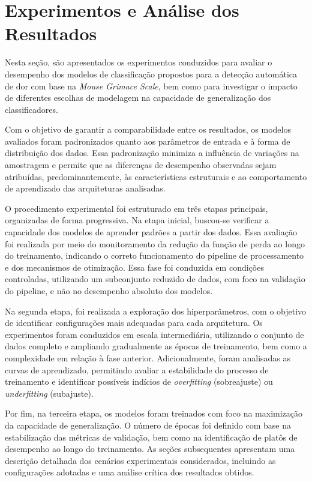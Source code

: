 \chapter[Experimentos e Análise dos Resultados]{Experimentos e Análise dos Resultados}

Nesta seção, são apresentados os experimentos conduzidos para avaliar o desempenho dos modelos de classificação propostos para a detecção automática de dor com base na \textit{Mouse Grimace Scale}, bem como para investigar o impacto de diferentes escolhas de modelagem na capacidade de generalização dos classificadores.

Com o objetivo de garantir a comparabilidade entre os resultados, os modelos avaliados foram padronizados quanto aos parâmetros de entrada e à forma de distribuição dos dados. Essa padronização minimiza a influência de variações na amostragem e permite que as diferenças de desempenho observadas sejam atribuídas, predominantemente, às características estruturais e ao comportamento de aprendizado das arquiteturas analisadas.

O procedimento experimental foi estruturado em três etapas principais, organizadas de forma progressiva. Na etapa inicial, buscou-se verificar a capacidade dos modelos de aprender padrões a partir dos dados. Essa avaliação foi realizada por meio do monitoramento da redução da função de perda ao longo do treinamento, indicando o correto funcionamento do pipeline de processamento e dos mecanismos de otimização. Essa fase foi conduzida em condições controladas, utilizando um subconjunto reduzido de dados, com foco na validação do pipeline, e não no desempenho absoluto dos modelos.

Na segunda etapa, foi realizada a exploração dos hiperparâmetros, com o objetivo de identificar configurações mais adequadas para cada arquitetura. Os experimentos foram conduzidos em escala intermediária, utilizando o conjunto de dados completo e ampliando gradualmente as épocas de treinamento, bem como a complexidade em relação à fase anterior. Adicionalmente, foram analisadas as curvas de aprendizado, permitindo avaliar a estabilidade do processo de treinamento e identificar possíveis indícios de \textit{overfitting} (sobreajuste) ou \textit{underfitting} (subajuste).

Por fim, na terceira etapa, os modelos foram treinados com foco na maximização da capacidade de generalização. O número de épocas foi definido com base na estabilização das métricas de validação, bem como na identificação de platôs de desempenho ao longo do treinamento. As seções subsequentes apresentam uma descrição detalhada dos cenários experimentais considerados, incluindo as configurações adotadas e uma análise crítica dos resultados obtidos.

